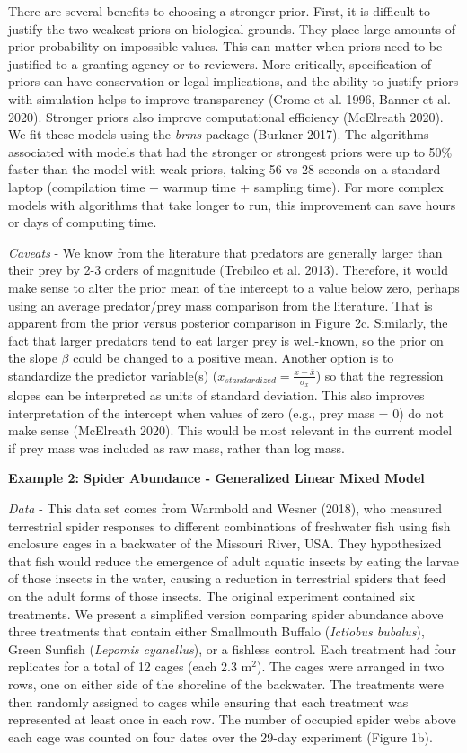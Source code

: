 \documentclass[
  12pt,
]{article}
\begin{document}
There are several benefits to choosing a stronger prior. First, it is
difficult to justify the two weakest priors on biological grounds. They
place large amounts of prior probability on impossible values. This can
matter when priors need to be justified to a granting agency or to
reviewers. More critically, specification of priors can have
conservation or legal implications, and the ability to justify priors
with simulation helps to improve transparency (Crome et al. 1996, Banner
et al. 2020). Stronger priors also improve computational efficiency
(McElreath 2020). We fit these models using the \emph{brms} package
(Burkner 2017). The algorithms associated with models that had the
stronger or strongest priors were up to 50\% faster than the model with
weak priors, taking 56 vs 28 seconds on a standard laptop (compilation
time + warmup time + sampling time). For more complex models with
algorithms that take longer to run, this improvement can save hours or
days of computing time.

\emph{Caveats} - We know from the literature that predators are
generally larger than their prey by 2-3 orders of magnitude (Trebilco et
al. 2013). Therefore, it would make sense to alter the prior mean of the
intercept to a value below zero, perhaps using an average predator/prey
mass comparison from the literature. That is apparent from the prior
versus posterior comparison in Figure 2c. Similarly, the fact that
larger predators tend to eat larger prey is well-known, so the prior on
the slope \(\beta\) could be changed to a positive mean. Another option
is to standardize the predictor variable(s)
(\(x_{standardized} = \frac{x-\bar{x}}{\sigma_{x}}\)) so that the
regression slopes can be interpreted as units of standard deviation.
This also improves interpretation of the intercept when values of zero
(e.g., prey mass = 0) do not make sense (McElreath 2020). This would be
most relevant in the current model if prey mass was included as raw
mass, rather than log mass.

\textbf{Example 2: Spider Abundance - Generalized Linear Mixed Model}

\emph{Data} - This data set comes from Warmbold and Wesner (2018), who
measured terrestrial spider responses to different combinations of
freshwater fish using fish enclosure cages in a backwater of the
Missouri River, USA. They hypothesized that fish would reduce the
emergence of adult aquatic insects by eating the larvae of those insects
in the water, causing a reduction in terrestrial spiders that feed on
the adult forms of those insects. The original experiment contained six
treatments. We present a simplified version comparing spider abundance
above three treatments that contain either Smallmouth Buffalo
(\emph{Ictiobus bubalus}), Green Sunfish (\emph{Lepomis cyanellus}), or
a fishless control. Each treatment had four replicates for a total of 12
cages (each 2.3 m\(^2\)). The cages were arranged in two rows, one on
either side of the shoreline of the backwater. The treatments were then
randomly assigned to cages while ensuring that each treatment was
represented at least once in each row. The number of occupied spider
webs above each cage was counted on four dates over the 29-day
experiment (Figure 1b).
\end{document}
